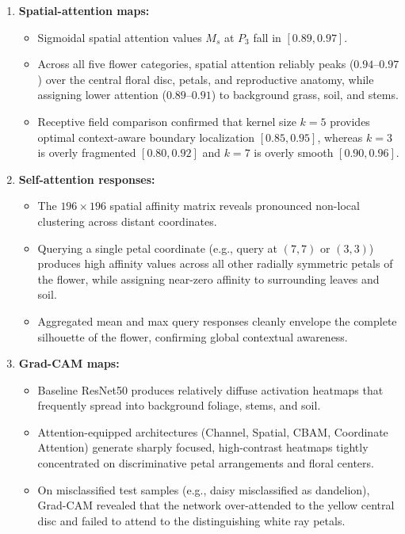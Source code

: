 \documentclass[10pt]{article}
\begin{document}
\begin{enumerate}
\item \textbf{Spatial-attention maps:}
\begin{itemize}
\item Sigmoidal spatial attention values $M_s$ at $P_3$ fall in $[0.89, 0.97]$.
\item Across all five flower categories, spatial attention reliably peaks ($0.94$--$0.97$) over the central floral disc, petals, and reproductive anatomy, while assigning lower attention ($0.89$--$0.91$) to background grass, soil, and stems.
\item Receptive field comparison confirmed that kernel size $k=5$ provides optimal context-aware boundary localization $[0.85, 0.95]$, whereas $k=3$ is overly fragmented $[0.80, 0.92]$ and $k=7$ is overly smooth $[0.90, 0.96]$.
\end{itemize}

\item \textbf{Self-attention responses:}
\begin{itemize}
\item The $196 \times 196$ spatial affinity matrix reveals pronounced non-local clustering across distant coordinates.
\item Querying a single petal coordinate (e.g., query at $(7,7)$ or $(3,3)$) produces high affinity values across all other radially symmetric petals of the flower, while assigning near-zero affinity to surrounding leaves and soil.
\item Aggregated mean and max query responses cleanly envelope the complete silhouette of the flower, confirming global contextual awareness.
\end{itemize}

\item \textbf{Grad-CAM maps:}
\begin{itemize}
\item Baseline ResNet50 produces relatively diffuse activation heatmaps that frequently spread into background foliage, stems, and soil.
\item Attention-equipped architectures (Channel, Spatial, CBAM, Coordinate Attention) generate sharply focused, high-contrast heatmaps tightly concentrated on discriminative petal arrangements and floral centers.
\item On misclassified test samples (e.g., daisy misclassified as dandelion), Grad-CAM revealed that the network over-attended to the yellow central disc and failed to attend to the distinguishing white ray petals.
\end{itemize}


\end{enumerate}
\end{document}

